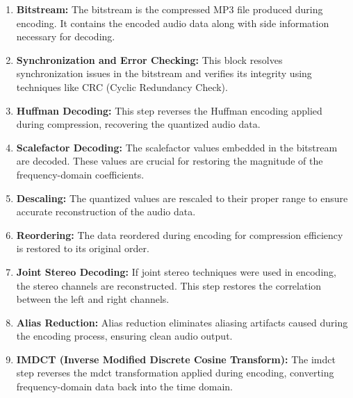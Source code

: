 \documentclass{ioereport}
\begin{document}
        \begin{enumerate}[label=\textbf{\roman*.}]
            \item \textbf{Bitstream:}  
            The bitstream is the compressed MP3 file produced during encoding. It contains the encoded audio data along with side information necessary for decoding.
        
            \item \textbf{Synchronization and Error Checking:}  
            This block resolves synchronization issues in the bitstream and verifies its integrity using techniques like CRC (Cyclic Redundancy Check).
        
            \item \textbf{Huffman Decoding:}  
            This step reverses the Huffman encoding applied during compression, recovering the quantized audio data.
        
            \item \textbf{Scalefactor Decoding:}  
            The scalefactor values embedded in the bitstream are decoded. These values are crucial for restoring the magnitude of the frequency-domain coefficients.
        
            \item \textbf{Descaling:}  
            The quantized values are rescaled to their proper range to ensure accurate reconstruction of the audio data.
        
            \item \textbf{Reordering:}  
            The data reordered during encoding for compression efficiency is restored to its original order.
        
            \item \textbf{Joint Stereo Decoding:}  
            If joint stereo techniques were used in encoding, the stereo channels are reconstructed. This step restores the correlation between the left and right channels.
        
            \item \textbf{Alias Reduction:}  
            Alias reduction eliminates aliasing artifacts caused during the encoding process, ensuring clean audio output.
        
            \item \textbf{IMDCT (Inverse Modified Discrete Cosine Transform):}  
            The \gls{imdct} step reverses the \gls{mdct} transformation applied during encoding, converting frequency-domain data back into the time domain.
        

\end{enumerate}
\end{document}

